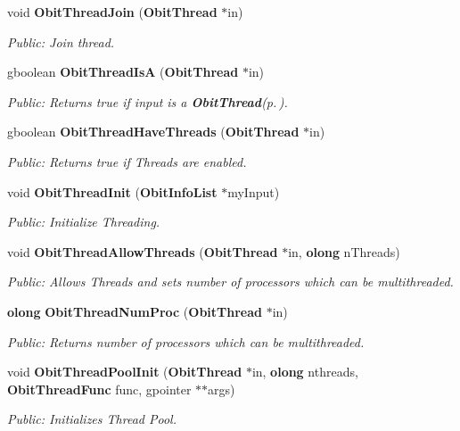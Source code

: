 \begin{CompactItemize}
void {\bf Obit\-Thread\-Join} ({\bf Obit\-Thread} $\ast$in)
\begin{CompactList}\small\item\em Public: Join thread. \item\end{CompactList}\item 
gboolean {\bf Obit\-Thread\-Is\-A} ({\bf Obit\-Thread} $\ast$in)
\begin{CompactList}\small\item\em Public: Returns true if input is a {\bf Obit\-Thread}{\rm (p.\,\pageref{structObitThread})}. \item\end{CompactList}\item 
gboolean {\bf Obit\-Thread\-Have\-Threads} ({\bf Obit\-Thread} $\ast$in)
\begin{CompactList}\small\item\em Public: Returns true if Threads are enabled. \item\end{CompactList}\item 
void {\bf Obit\-Thread\-Init} ({\bf Obit\-Info\-List} $\ast$my\-Input)
\begin{CompactList}\small\item\em Public: Initialize Threading. \item\end{CompactList}\item 
void {\bf Obit\-Thread\-Allow\-Threads} ({\bf Obit\-Thread} $\ast$in, {\bf olong} n\-Threads)
\begin{CompactList}\small\item\em Public: Allows Threads and sets number of processors which can be multithreaded. \item\end{CompactList}\item 
{\bf olong} {\bf Obit\-Thread\-Num\-Proc} ({\bf Obit\-Thread} $\ast$in)
\begin{CompactList}\small\item\em Public: Returns number of processors which can be multithreaded. \item\end{CompactList}\item 
void {\bf Obit\-Thread\-Pool\-Init} ({\bf Obit\-Thread} $\ast$in, {\bf olong} nthreads, {\bf Obit\-Thread\-Func} func, gpointer $\ast$$\ast$args)
\begin{CompactList}\small\item\em Public: Initializes Thread Pool. \item\end{CompactList}\item 
$$
\end{CompactItemize}
